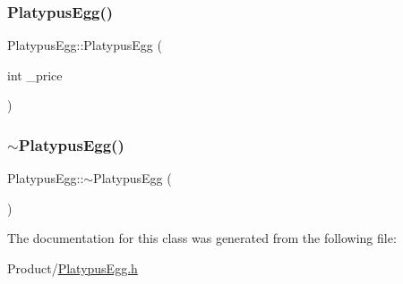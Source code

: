 \mbox{\label{classPlatypusEgg_ad5303313d178847e813ae1e4b2d92a6d}} 
\subsubsection{\texorpdfstring{PlatypusEgg()}{PlatypusEgg()}\hspace{0.1cm}{\footnotesize\ttfamily [2/2]}}
{\footnotesize\ttfamily Platypus\+Egg\+::\+Platypus\+Egg (\begin{DoxyParamCaption}\item[{int}]{\+\_\+price }\end{DoxyParamCaption})}

\mbox{\label{classPlatypusEgg_a94bde95b8b3d41f24d820429b156ce19}} 
\subsubsection{\texorpdfstring{$\sim$PlatypusEgg()}{~PlatypusEgg()}}
{\footnotesize\ttfamily Platypus\+Egg\+::$\sim$\+Platypus\+Egg (\begin{DoxyParamCaption}{ }\end{DoxyParamCaption})}



The documentation for this class was generated from the following file\+:\begin{DoxyCompactItemize}
\item 
Product/\mbox{\hyperlink{PlatypusEgg_8h}{Platypus\+Egg.\+h}}\end{DoxyCompactItemize}

